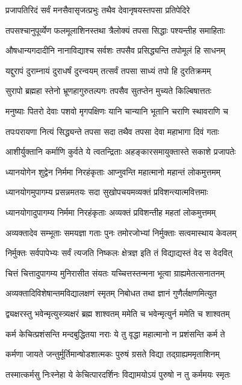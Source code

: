 \twolineshloka
{प्रजापतिरिदं सर्वं मनसैवासृजत्प्रभुः}
{तथैव देवानृषयस्तपसा प्रतिपेदिरे}


\twolineshloka
{तपसश्चानुपूर्व्येण फलमूलाशिनस्तथा}
{त्रैलोक्यं तपसा सिद्धाः पश्यन्तीह समाहिताः}


\twolineshloka
{औषधान्यगदादीनि नानाविद्याश्च सर्वशः}
{तपसैव प्रसिद्ध्यन्ति तपोमूलं हि साधनम्}


\twolineshloka
{यद्दुरापं दुराम्नायं दुराधर्षं दुरन्वयम्}
{तत्सर्वं तपसा साध्यं तपो हि दुरतिक्रमम्}


\twolineshloka
{सुरापो ब्रह्महा स्तेनो भ्रूणहागुरुतल्पगः}
{तपसैव सुतप्तेन मुच्यते किल्बिषात्ततः}


\twolineshloka
{मनुष्याः पितरो देवाः पशवो मृगपक्षिणः}
{यानि चान्यानि भूतानि चराणि स्थावराणि च}


\twolineshloka
{तपःपरायणा नित्यं सिद्ध्यन्ते तपसा सदा}
{तथैव तपसा देवा महाभागा दिवं गताः}


\twolineshloka
{आशीर्युक्तानि कर्माणि कुर्वते ये त्वतन्द्रिताः}
{अहङ्कारसमायुक्तास्ते सकाशे प्रजापतेः}


\twolineshloka
{ध्यानयोगेन शुद्वेन निर्ममा निरहंकृताः}
{आप्नुवन्ति महात्मानो महान्तं लोकमुत्तमम्}


\twolineshloka
{ध्यानयोगमुपागम्य प्रसन्नमतयः सदा}
{सुखोपचयमव्यक्तं प्रविशन्त्यात्मवित्तमाः}


\twolineshloka
{ध्यानयोगादुपागम्य निर्ममा निरहंकृताः}
{अव्यक्तं प्रविशन्तीह महतां लोकमुत्तमम्}


\twolineshloka
{अव्यक्तादेव सम्भूताः समयज्ञा गताः पुनः}
{तमोरजोभ्यां निर्मुक्ताः सत्वमास्थाय केवलम्}


\twolineshloka
{निर्मुक्तः सर्वपापेभ्यः सर्वं त्यजति निष्कलः}
{क्षेत्रज्ञ इति तं विद्याद्यस्तं वेद स वेदवित्}


\twolineshloka
{चित्तं चित्तादुपागम्य मुनिरासीत संयतः}
{यच्चित्तस्तन्मना भूत्वा ग्राह्यमेतत्सनातनम्}


\twolineshloka
{अव्यक्तादिविशेषान्तमविद्यालक्षणं स्मृतम्}
{निबोधत तथा ज्ञानं गुणैर्लक्षणमित्युत}


\twolineshloka
{द्व्यक्षरस्तु भवेन्मृत्युस्त्र्यक्षरं ब्रह्म शाश्वतम्}
{ममेति च भवेन्मृत्युर्न ममेति च शाश्वतम्}


\twolineshloka
{कर्म केचित्प्रशंसन्ति मन्दबुद्धितया नराः}
{ये तु वृद्धा महात्मानो न प्रशंसन्ति कर्म ते}


\twolineshloka
{कर्मणा जायते जन्तुर्मूर्तिमान्षोडशात्मकः}
{पुरुषं ग्रसते विद्या तद्ग्राह्यममृताशिनम्}


\twolineshloka
{तस्मात्कर्मसु निःस्नेहा ये केचित्पारदर्शिनः}
{विद्यामयोऽयं पुरुषो न तु कर्ममयः स्मृतः}


